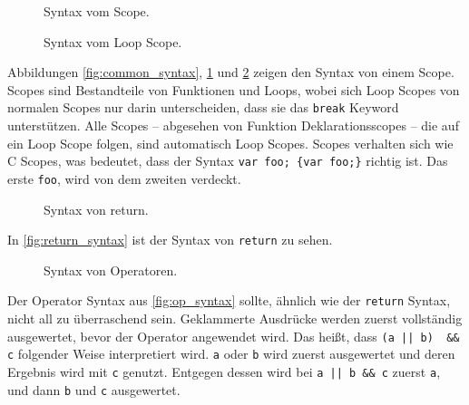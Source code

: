     \begin{figure}[H]
      \centering
      \caption{Syntax vom Scope.}
      \label{fig:scope_syntax}
    \end{figure}

    \begin{figure}[H]
      \centering
      \caption{Syntax vom Loop Scope.}
      \label{fig:loop_scope_syntax}
    \end{figure}
    Abbildungen \ref{fig:common_syntax}, \ref{fig:scope_syntax} und \ref{fig:loop_scope_syntax} zeigen den Syntax von einem Scope. Scopes sind Bestandteile von Funktionen und Loops, wobei sich Loop Scopes von normalen Scopes nur darin unterscheiden, dass sie das \lstinline[style=MyMacroStyle]$break$ Keyword unterstützen. Alle Scopes -- abgesehen von Funktion Deklarationsscopes -- die auf ein Loop Scope folgen, sind automatisch Loop Scopes. Scopes verhalten sich wie C Scopes, was bedeutet, dass der Syntax \lstinline[style=MyMacroStyle]$var foo; {var foo;}$ richtig ist. Das erste \lstinline[style=MyMacroStyle]$foo$, wird von dem zweiten verdeckt.

    \begin{figure}[H]
      \centering
      \caption{Syntax von return.}
      \label{fig:return_syntax}
    \end{figure}
    In \autoref{fig:return_syntax} ist der Syntax von \lstinline[style=MyMacroStyle]$return$ zu sehen.

    \begin{figure}[H]
      \centering
      \caption{Syntax von Operatoren.}
      \label{fig:op_syntax}
    \end{figure}
    Der Operator Syntax aus \autoref{fig:op_syntax} sollte, ähnlich wie der \lstinline[style=MyMacroStyle]$return$ Syntax, nicht all zu überraschend sein. Geklammerte Ausdrücke werden zuerst vollständig ausgewertet, bevor der Operator angewendet wird. Das heißt, dass \lstinline[style=MyMacroStyle]$(a || b)  && c$ folgender Weise interpretiert wird. \lstinline[style=MyMacroStyle]$a$ oder \lstinline[style=MyMacroStyle]$b$ wird zuerst ausgewertet und deren Ergebnis wird mit \lstinline[style=MyMacroStyle]$c$ genutzt. Entgegen dessen wird bei \lstinline[style=MyMacroStyle]$a || b && c$ zuerst \lstinline[style=MyMacroStyle]$a$, und dann \lstinline[style=MyMacroStyle]$b$ und \lstinline[style=MyMacroStyle]$c$ ausgewertet.

